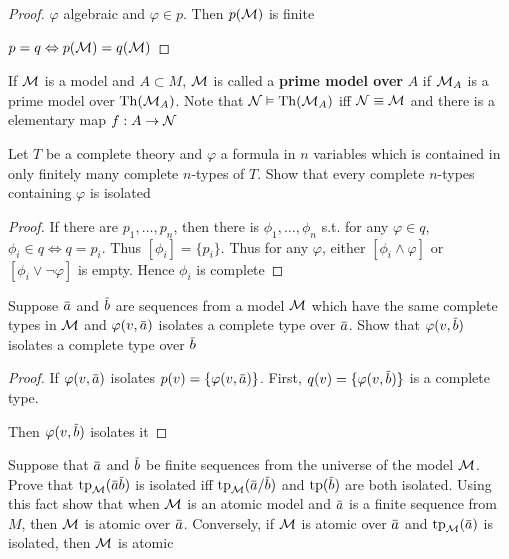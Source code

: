 \documentclass[11pt]{article}
\begin{document}
\begin{proof}
\(\varphi\) algebraic and \(\varphi\in p\). Then \(p(\mathcal{M})\) is finite

\(p=q\Leftrightarrow p(\mathcal{M})=q(\mathcal{M})\)
\end{proof}


If \(\mathcal{M}\) is a model and \(A\subset M\), \(\mathcal{M}\) is called a \textbf{prime model over} \(A\) if \(\mathcal{M}_A\) is a prime
model over \(\operatorname{Th}(\mathcal{M}_A)\). Note that \(\mathcal{N}\vDash\operatorname{Th}(\mathcal{M}_A)\) iff \(\mathcal{N}\equiv\mathcal{M}\) and there is a elementary
map \(f:A\to\mathcal{N}\)

\begin{exercise}
\label{ex2.1.2}
Let \(T\) be a complete theory and \(\varphi\) a formula in \(n\) variables which is contained in only
finitely many complete \(n\)-types of \(T\). Show that every complete \(n\)-types containing
\(\varphi\) is isolated
\end{exercise}

\begin{proof}
If there are \(p_1,\dots,p_n\), then there is \(\phi_1,\dots,\phi_n\) s.t. for
any \(\varphi\in q\), \(\phi_i\in q\Leftrightarrow  q=p_i\). Thus \([\phi_i]=\{p_i\}\). Thus for any \(\varphi\), either \([\phi_i\wedge\varphi]\)
or \([\phi_i\vee\neg\varphi]\) is empty. Hence \(\phi_i\) is complete
\end{proof}

\begin{exercise}
\label{ex2.1.3}
Suppose \(\bara\) and \(\barb\) are sequences from a model \(\mathcal{M}\) which have the same complete
types in \(\mathcal{M}\) and \(\varphi(v,\bara)\) isolates a complete type over \(\bara\). Show
that \(\varphi(v,\barb)\) isolates a complete type over \(\barb\)
\end{exercise}

\begin{proof}
If \(\varphi(v,\bara)\) isolates \(p(v)=\{\varphi(v,\bara)\}\). First, \(q(v)=\{\varphi(v,\barb)\}\) is a complete
type.

Then \(\varphi(v,\barb)\) isolates it
\end{proof}

\begin{exercise}
\label{ex2.1.4}
Suppose that \(\bara\) and \(\barb\) be finite sequences from the universe of the model \(\mathcal{M}\).
Prove that \(\tp_{\calm}(\bara\barb)\) is isolated iff \(\tp_{\calm}(\bara/\barb)\) and \(\tp(\barb)\)
are both isolated. Using this fact show that when \(\mathcal{M}\) is an atomic model and \(\bara\) is a
finite sequence from \(M\), then \(\mathcal{M}\) is atomic over \(\bara\). Conversely, if \(\mathcal{M}\) is atomic
over \(\bara\) and \(\tp_{\calm}(\bara)\) is isolated, then \(\mathcal{M}\) is atomic
\end{exercise}
\end{document}
